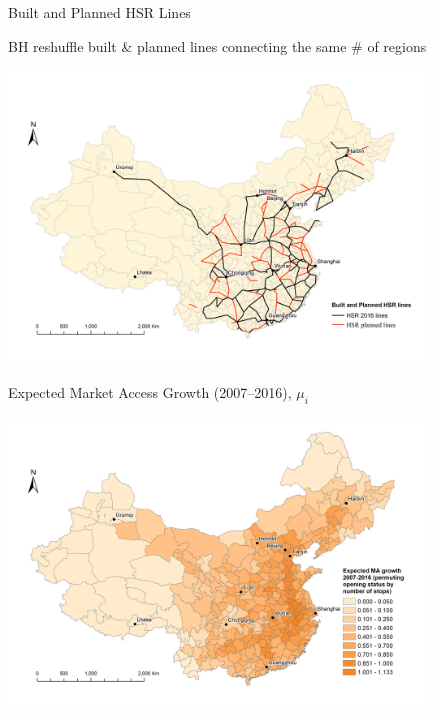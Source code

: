 \documentclass{beamer}
\begin{document}
\begin{frame}[t,label=BuiltPlanned]{Built and Planned HSR Lines}
\vspace{-0.5cm}
	\begin{center}
	BH reshuffle built \& planned lines connecting the same \# of regions 
	
	\includegraphics[trim={1cm 0.5cm 0.5cm 1cm},clip,width=11cm]{lecture_includes/Lines_actual_planned.png}
	\end{center}
\end{frame}

\begin{frame}[t,label=HSRExpected]{Expected Market Access Growth (2007--2016), $\mu_i$}
	\begin{center}
	
	\includegraphics[trim={1cm 0.5cm 0cm 1cm},clip,width=11cm]{lecture_includes/NlinkExpected2016.png}
	
	\phantom{X}
	\end{center}
\end{frame}
\end{document}
